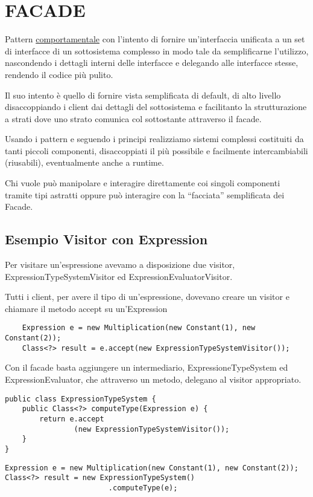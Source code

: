\chapter{FACADE}

Pattern \underline{comportamentale} con l'intento di fornire un'interfaccia unificata a un set di interfacce di un sottosistema complesso in modo tale da semplificarne 
l'utilizzo, nascondendo i dettagli interni delle interfacce e delegando alle interfacce stesse, rendendo il codice più pulito.

Il suo intento è quello di fornire vista semplificata di default, di alto livello disaccoppiando i client dai dettagli del sottosistema e facilitanto la strutturazione 
a strati dove uno strato comunica col sottostante attraverso il facade.

Usando i pattern e seguendo i principi realizziamo sistemi complessi costituiti da tanti piccoli componenti, disaccoppiati il più possibile e facilmente 
intercambiabili (riusabili), eventualmente anche a runtime.

Chi vuole può manipolare e interagire direttamente coi singoli componenti tramite tipi astratti oppure può interagire con la “facciata” semplificata dei Facade.

\section{Esempio Visitor con Expression}

Per visitare un'espressione avevamo a disposizione due visitor, ExpressionTypeSystemVisitor ed ExpressionEvaluatorVisitor.

Tutti i client, per avere il tipo di un’espressione, dovevano creare un visitor e chiamare il metodo accept su un'Expression

\begin{lstlisting}
    Expression e = new Multiplication(new Constant(1), new Constant(2));
    Class<?> result = e.accept(new ExpressionTypeSystemVisitor());
\end{lstlisting}

Con il facade basta aggiungere un intermediario, ExpressioneTypeSystem ed ExpressionEvaluator, che attraverso un metodo, delegano al visitor appropriato.

\begin{multicols}{2}
    \begin{lstlisting}
public class ExpressionTypeSystem {
    public Class<?> computeType(Expression e) {
        return e.accept
                (new ExpressionTypeSystemVisitor());
    }
}
    \end{lstlisting}
\columnbreak
    \begin{lstlisting}
Expression e = new Multiplication(new Constant(1), new Constant(2));
Class<?> result = new ExpressionTypeSystem()
                        .computeType(e);
    \end{lstlisting}
\end{multicols}

